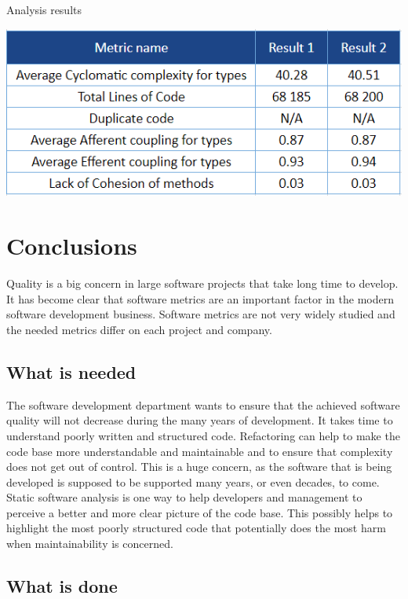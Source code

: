 \begin{table}[t!]
\centering
\caption{Analysis results}
\includegraphics[scale=0.8]{results.png}
\label{fig:results}
\end{table}


\chapter{Conclusions}

Quality is a big concern in large software projects that take long time to develop.
It has become clear that software metrics are an important factor in the modern software development business. Software metrics are not very widely studied and the needed metrics differ on each project and company. 

\section{What is needed}
The software development department wants to ensure that the achieved software quality will not decrease during the many years of development. It takes time to understand poorly written and structured code. Refactoring can help to make the code base more understandable and maintainable and to ensure that complexity does not get out of control. This is a huge concern, as the software that is being developed is supposed to be supported many years, or even decades, to come. Static software analysis is one way to help developers and management to perceive a better and more clear picture of the code base. This possibly helps to highlight the most poorly structured code that potentially does the most harm when maintainability is concerned.

\section{What is done}

